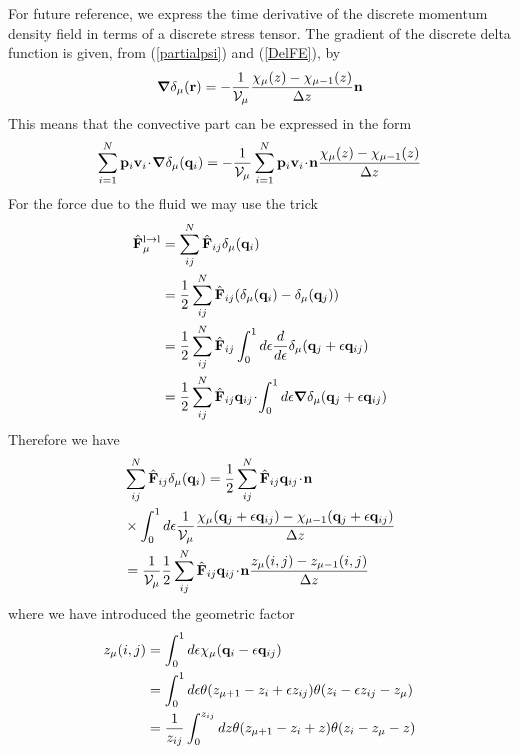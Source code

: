 \documentclass[b5paper,openright,11pt]{book}
\newcommand{\esc}{\!\cdot\!}
\begin{document}
For future reference,  we express the time derivative  of the discrete
momentum density field  in terms of a discrete stress  tensor. 
The  gradient   of  the  discrete   delta  function  is   given,  from
(\ref{partialpsi}) and (\ref{DelFE}), by
\begin{align}
  \boldsymbol{\nabla}\delta_\mu({\bf r})=-\frac{1}{{\cal V}_\mu}\frac{\chi_\mu(z)-\chi_{\mu-1}(z)}{\Delta z} {\bf n}
\end{align}
This means that the convective part can be expressed in the form
\begin{align}
  \sum_{i=1}^N{\bf p}_i{\bf v}_i\esc\boldsymbol{\nabla}\delta_\mu({\bf q}_i)&=
-\frac{1}{{\cal V}_\mu} \sum_{i=1}^N{\bf p}_i{\bf v}_i\esc{\bf n}\frac{\chi_\mu(z)-\chi_{\mu-1}(z)}{\Delta z}
\nonumber\\ 
\end{align}
For the force due to the fluid we may use the trick
\begin{align}
  \hat{{\bf F}}_\mu^{\rm l\to l}&=  \sum_{ij}^N\hat{\bf F}_{ij}\delta_\mu({\bf q}_i)
\nonumber\\
&=\frac{1}{2}\sum_{ij}^N\hat{\bf F}_{ij}
(\delta_\mu({\bf q}_i)-\delta_\mu({\bf q}_j))
\nonumber\\
&=\frac{1}{2}\sum_{ij}^N\hat{\bf F}_{ij}\int_0^1d\epsilon \frac{d}{d\epsilon}
\delta_\mu({\bf q}_j+\epsilon{\bf q}_{ij})
\nonumber\\
&=\frac{1}{2}\sum_{ij}^N\hat{\bf F}_{ij}{\bf q}_{ij}\esc\int_0^1d\epsilon 
\boldsymbol{\nabla}\delta_\mu({\bf q}_j+\epsilon{\bf q}_{ij})
\end{align}
Therefore we have
\begin{align}
 &  \sum_{ij}^N\hat{\bf F}_{ij}\delta_\mu({\bf q}_i)
=\frac{1}{2}\sum_{ij}^N\hat{\bf F}_{ij}{\bf q}_{ij}\esc{\bf n}\nonumber\\
& 
\times
\int_0^1d\epsilon 
\frac{1}{{\cal V}_\mu}\frac{\chi_\mu({\bf q}_j+\epsilon{\bf q}_{ij})-\chi_{\mu-1}({\bf q}_j+\epsilon{\bf q}_{ij})}{\Delta z} 
\nonumber\\
& 
=\frac{1}{{\cal V}_\mu}\frac{1}{2}\sum_{ij}^N\hat{\bf F}_{ij}{\bf q}_{ij}\esc{\bf n}
\frac{z_\mu(i,j)-z_{\mu-1}(i,j)}{\Delta z} 
\label{Fvir}
\end{align}
where we have introduced the geometric factor 
\begin{align}
z_\mu(i,j)&=  \int_0^{1}d\epsilon\chi_\mu({\bf q}_i-\epsilon{\bf q}_{ij})
\nonumber\\
&=  \int_0^{1}d\epsilon
\theta(z_{\mu+1}-z_i+\epsilon z_{ij})\theta(z_i-\epsilon z_{ij}-z_\mu)
\nonumber\\
&= \frac{1}{z_{ij}} \int_0^{z_{ij}}dz
\theta(z_{\mu+1}-z_i+z)\theta(z_i-z_\mu-z)
\label{int}
\end{align}
\end{document}
